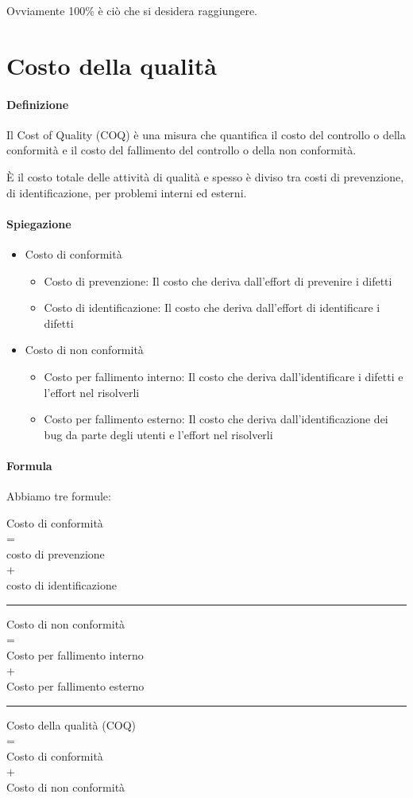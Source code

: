 \documentclass[11pt,a4paper]{book}
\begin{document}
Ovviamente 100\% è ciò che si desidera raggiungere.

\section{Costo della qualità}
\paragraph{Definizione}
Il Cost of Quality (COQ) è una misura che quantifica il costo del controllo o della conformità e il costo del fallimento del controllo o della non conformità.

È il costo totale delle attività di qualità e spesso è diviso tra costi di prevenzione, di identificazione, per problemi interni ed esterni.

\paragraph{Spiegazione}
\begin{itemize}
	\item Costo di conformità
		\begin{itemize}
			\item Costo di prevenzione: Il costo che deriva dall'effort di prevenire i difetti
			\item Costo di identificazione: Il costo che deriva dall'effort di identificare i difetti
		\end{itemize}
	\item Costo di non conformità
		\begin{itemize}
			\item Costo per fallimento interno: Il costo che deriva dall'identificare i difetti e l'effort nel risolverli
			\item Costo per fallimento esterno: Il costo che deriva dall'identificazione dei bug da parte degli utenti e l'effort nel risolverli
		\end{itemize}
\end{itemize}

\paragraph{Formula}
Abbiamo tre formule:
\begin{center}
	Costo di conformità\\=\\costo di prevenzione\\+\\costo di identificazione
	\rule{\textwidth}{0.4pt}
	Costo di non conformità\\=\\Costo per fallimento interno\\+\\Costo per fallimento esterno
	\rule{\textwidth}{0.4pt}
	Costo della qualità (COQ)\\=\\Costo di conformità\\+\\Costo di non conformità
\end{center}
\end{document}
